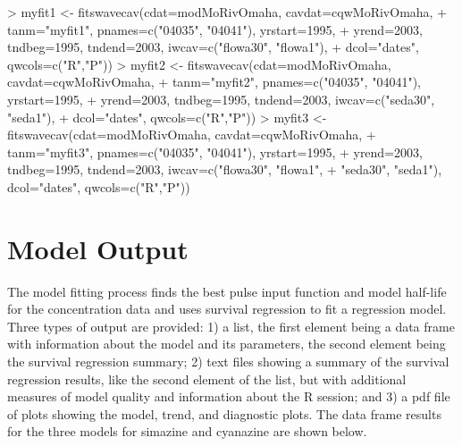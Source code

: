 \documentclass[11pt]{article}
\begin{document}
\begin{Schunk}
\begin{Sinput}
> myfit1 <- fitswavecav(cdat=modMoRivOmaha, cavdat=cqwMoRivOmaha,
+ tanm="myfit1", pnames=c("04035", "04041"), yrstart=1995,
+ yrend=2003, tndbeg=1995, tndend=2003, iwcav=c("flowa30", "flowa1"),
+ dcol="dates", qwcols=c("R","P"))
> myfit2 <- fitswavecav(cdat=modMoRivOmaha, cavdat=cqwMoRivOmaha,
+ tanm="myfit2", pnames=c("04035", "04041"), yrstart=1995,
+ yrend=2003, tndbeg=1995, tndend=2003, iwcav=c("seda30", "seda1"),
+ dcol="dates", qwcols=c("R","P"))
> myfit3 <- fitswavecav(cdat=modMoRivOmaha, cavdat=cqwMoRivOmaha,
+ tanm="myfit3", pnames=c("04035", "04041"), yrstart=1995,
+ yrend=2003, tndbeg=1995, tndend=2003, iwcav=c("flowa30", "flowa1",
+ "seda30", "seda1"), dcol="dates", qwcols=c("R","P"))
\end{Sinput}
\end{Schunk}

\section{Model Output}
The model fitting process finds the best pulse input function and model half-life for the concentration data and uses survival regression to fit a regression model.  Three types of output are provided: 1) a list, the first element being a data frame with information about the model and its parameters, the second element being the survival regression summary; 2) text files showing a summary of the survival regression results, like the second element of the list, but with  additional measures of model quality and information about the R session; and 3) a pdf file of plots showing the model, trend, and diagnostic plots.  The data frame results for the three models for simazine and cyanazine are shown below.
\vspace{5 mm}
\end{document}
